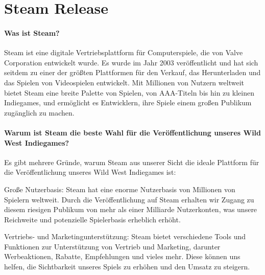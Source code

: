 
\chapter{Steam Release}\label{ch:steamrelease}
\renewcommand{\kapitelautor}{Autor: Nils} %

%
\subsubsection{Was ist Steam?}\label{subsubsec:Steam-Vorstellung}

Steam ist eine digitale Vertriebsplattform für Computerspiele, die von Valve Corporation entwickelt wurde. Es wurde im Jahr 2003 veröffentlicht und hat sich seitdem zu einer der größten Plattformen für den Verkauf, das Herunterladen und das Spielen von Videospielen entwickelt. Mit Millionen von Nutzern weltweit bietet Steam eine breite Palette von Spielen, von AAA-Titeln bis hin zu kleinen Indiegames, und ermöglicht es Entwicklern, ihre Spiele einem großen Publikum zugänglich zu machen.\cite[vgl.]{Steam}

\subsubsection{Warum ist Steam die beste Wahl für die Veröffentlichung unseres Wild West Indiegames?}\label{subsubsec:Warum-Steam}

Es gibt mehrere Gründe, warum Steam aus unserer Sicht die ideale Plattform für die Veröffentlichung unseres Wild West Indiegames ist:

Große Nutzerbasis: Steam hat eine enorme Nutzerbasis von Millionen von Spielern weltweit. Durch die Veröffentlichung auf Steam erhalten wir Zugang zu diesem riesigen Publikum von mehr als einer Milliarde Nutzerkonten, was unsere Reichweite und potenzielle Spielerbasis erheblich erhöht.\cite[vgl.]{Steamzahlen}

Vertriebs- und Marketingunterstützung: Steam bietet verschiedene Tools und Funktionen zur Unterstützung von Vertrieb und Marketing, darunter Werbeaktionen, Rabatte, Empfehlungen und vieles mehr. Diese können uns helfen, die Sichtbarkeit unseres Spiels zu erhöhen und den Umsatz zu steigern.

